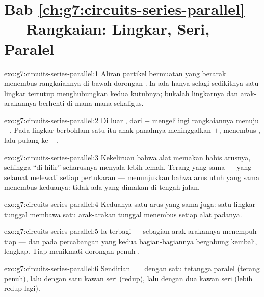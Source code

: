 \section*{Bab \ref{ch:g7:circuits-series-parallel} --- Rangkaian: Lingkar, Seri, Paralel}

\begin{solution}{exo:g7:circuits-series-parallel:1}
Aliran partikel bermuatan yang berarak menembus rangkaiannya di bawah
dorongan . Ia ada hanya selagi sedikitnya satu lingkar
tertutup menghubungkan kedua kutubnya; bukalah lingkarnya dan
arak-arakannya berhenti di mana-mana sekaligus.
\end{solution}

\begin{solution}{exo:g7:circuits-series-parallel:2}
Di luar , dari $+$ mengelilingi rangkaiannya menuju $-$.
Pada lingkar berbohlam satu itu anak panahnya meninggalkan $+$,
menembus , lalu pulang ke $-$.
\end{solution}

\begin{solution}{exo:g7:circuits-series-parallel:3}
Kekeliruan bahwa alat memakan habis arusnya, sehingga  ``di
hilir'' seharusnya menyala lebih lemah. Terang yang sama --- yang
selamat melewati setiap pertukaran --- menunjukkan bahwa arus utuh
yang sama menembus keduanya: tidak ada yang dimakan di tengah jalan.
\end{solution}

\begin{solution}{exo:g7:circuits-series-parallel:4}
Keduanya satu arus yang sama juga: satu lingkar tunggal membawa satu
arak-arakan tunggal menembus setiap alat padanya.
\end{solution}

\begin{solution}{exo:g7:circuits-series-parallel:5}
Ia terbagi --- sebagian arak-arakannya menempuh tiap  --- dan
pada percabangan yang kedua bagian-bagiannya bergabung kembali,
lengkap. Tiap  menikmati dorongan penuh .
\end{solution}

\begin{solution}{exo:g7:circuits-series-parallel:6}
Sendirian $=$ dengan satu tetangga paralel (terang penuh), lalu dengan
satu kawan seri (redup), lalu dengan dua kawan seri (lebih redup
lagi).
\end{solution}

